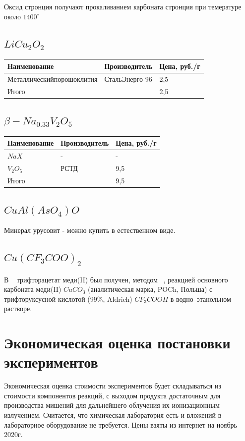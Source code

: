 \documentclass[11pt]{article}
\begin{document}
Оксид стронция получают прокаливанием карбоната стронция при темературе около $1400^\circ $


\subsection{$LiCu_2O_2$}
\begin{tabular}{|l|l|l|}
\hline
	Наименование  & Производитель & Цена, руб./г\\
\hline
	$Металлический порошок лития$ & СтальЭнерго-96 & 2,5\\
\hline	
	Итого & & 2,5 \\
\hline
\end{tabular}


\subsection{$\beta-Na_{0.33}V_2O_5$}

\begin{tabular}{|l|l|l|}
\hline
	Наименование  & Производитель & Цена, руб./г\\
\hline
	$NaX$ & - &  - \\
\hline
	$V_2O_5$ & РСТД & 9,5\\
\hline	
	Итого & & 9,5 \\
\hline
\end{tabular}

\subsection{$CuAl(AsO_4)O$}
Минерал урусовит - можно купить в естественном виде.


\subsection{$Cu(CF_3COO)_2$}
В ~\cite{rsc_c_2012} трифторацетат меди(II) был получен, методом ~\cite{Polyhedron_18_22}, реакцией основного карбоната меди(II) $CuCO_3$ (аналитическая марка, POCh, Польша) с трифторуксусной кислотой (99\%, Aldrich) $CF_3COOH$ в водно–этанольном растворе.


\section{Экономическая оценка постановки экспериментов}
Экономическая оценка стоимости экспериментов будет складываться из стоимости компонентов реакций, с выходом продукта достаточным для производства мишений для дальнейшего облучения их ионизационным излучением. Считается, что химическая лаборатория есть и вложений в лабораторное оборудование не требуется. Цены взяты из интернет на ноябрь 2020г.
\end{document}
